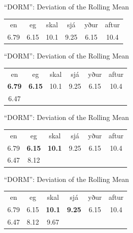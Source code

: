 \documentclass[hyperref={pdfpagelabels=false}]{beamer}
\begin{document}
\begin{frame}{``DORM'': Deviation of the Rolling Mean} 
	
	\begin{center}
		\begin{tabular}{c c c c c c}
			en & eg & skal & sjá & yður & aftur \\
			6.79 & 6.15 & 10.1 & 9.25 & 6.15 & 10.4\\
		\end{tabular}
	\end{center}
\end{frame}

\begin{frame}{``DORM'': Deviation of the Rolling Mean} 
	
	\begin{center}
		\begin{tabular}{c c c c c c}
			en & eg & skal & sjá & yður & aftur \\
			\textbf{6.79} & \textbf{6.15} & 10.1 & 9.25 & 6.15 & 10.4\\
			6.47 & & & & & 
		\end{tabular}
	\end{center}
	
\end{frame}

\begin{frame}{``DORM'': Deviation of the Rolling Mean} 
	
	\begin{center}
		\begin{tabular}{c c c c c c}
			en & eg & skal & sjá & yður & aftur \\
			6.79 & \textbf{6.15} & \textbf{10.1} & 9.25 & 6.15 & 10.4\\
			6.47 & 8.12 & & & & 
		\end{tabular}
	\end{center}
	
\end{frame}

\begin{frame}{``DORM'': Deviation of the Rolling Mean} 
	
	\begin{center}
		\begin{tabular}{c c c c c c}
			en & eg & skal & sjá & yður & aftur \\
			6.79 & 6.15 & \textbf{10.1} & \textbf{9.25} & 6.15 & 10.4\\
			6.47 & 8.12 & 9.67 & & & 
		\end{tabular}
	\end{center}
	
\end{frame}
\end{document}
